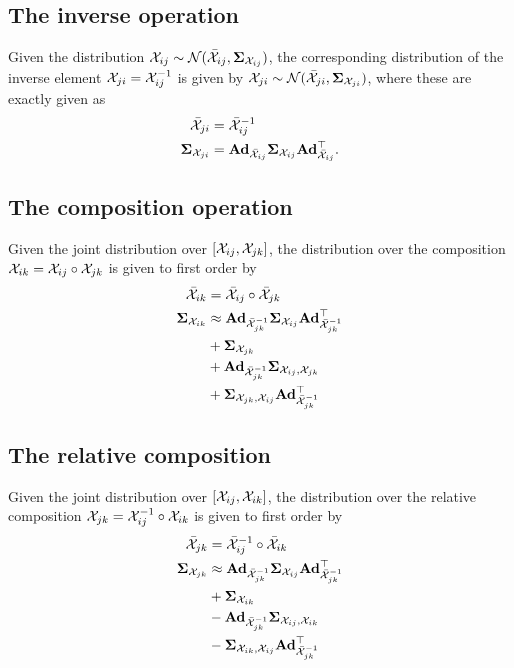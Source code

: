 \subsection{The inverse operation}
Given the distribution $\cX_{ij} \sim \cN(\bar{\cX}_{ij}, \matSigma_{\cX_{ij}})$, the corresponding distribution of the inverse element $\cX_{ji} = \cX_{ij}^{-1}$ is given by $\cX_{ji} \sim \cN(\bar{\cX}_{ji}, \matSigma_{\cX_{ji}})$, where these are exactly given as
\begin{align}
    \bar{\cX}_{ji} & = \bar{\cX}_{ij}^{-1}\\
    \matSigma_{\cX_{ji}} &= \mAd_{\bar{\cX}_{ij}} \matSigma_{\cX_{ij}} \mAd_{\bar{\cX}_{ij}}\trans.
\end{align}

\subsection{The composition operation}
Given the joint distribution over $[\cX_{ij}, \cX_{jk}]$, the distribution over the composition $\cX_{ik} = \cX_{ij} \circ \cX_{jk}$ is given to first order by
\begin{align}
    \bar{\cX}_{ik} &= \bar{\cX}_{ij} \circ \bar{\cX}_{jk}\\
    \matSigma_{\cX_{ik}} &\approx 
    \mAd_{\bar{\cX}_{jk}^{-1}} \matSigma_{\cX_{ij}} \mAd_{\bar{\cX}_{jk}^{-1}}\trans \nonumber\\
    &+ \matSigma_{\cX_{jk}} \nonumber\\
    &+ \mAd_{\bar{\cX}_{jk}^{-1}} \matSigma_{\cX_{ij}, \cX_{jk}}\\
    &+ \matSigma_{\cX_{jk}, \cX_{ij}} \mAd_{\bar{\cX}_{jk}^{-1}}\trans \nonumber
\end{align}

\subsection{The relative composition}
Given the joint distribution over $[\cX_{ij}, \cX_{ik}]$, the distribution over the relative composition $\cX_{jk} = \cX_{ij}^{-1} \circ \cX_{ik}$ is given to first order by
\begin{align}
  \bar{\cX}_{jk} &= \bar{\cX}_{ij}^{-1} \circ \bar{\cX}_{ik}\\
  \matSigma_{\cX_{jk}} &\approx 
  \mAd_{\bar{\cX}_{jk}^{-1}} \matSigma_{\cX_{ij}} \mAd_{\bar{\cX}_{jk}^{-1}}\trans \nonumber\\
    &+ \matSigma_{\cX_{ik}} \nonumber\\
    &- \mAd_{\bar{\cX}_{jk}^{-1}} \matSigma_{\cX_{ij}, \cX_{ik}}\\
    &- \matSigma_{\cX_{ik}, \cX_{ij}} \mAd_{\bar{\cX}_{jk}^{-1}}\trans \nonumber
\end{align}
